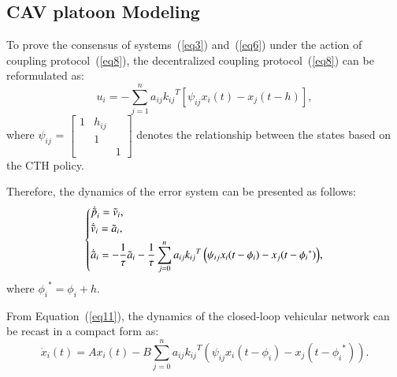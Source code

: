 \documentclass[journal]{IEEEtran}
\begin{document}
\subsection{CAV platoon Modeling}
\label{Section 3.2}

To prove the consensus of systems~(\ref{eq3}) and~(\ref{eq6}) under the action of coupling protocol~(\ref{eq8}), the decentralized coupling protocol~(\ref{eq8}) can be reformulated as:
\begin{equation}
  {u_i} =  - \sum\limits_{j = 1}^n {{a_{ij}}{k_{ij}}^T\left[ {{\psi _{ij}}{x_i}(t) - {x_j}(t - h)} \right]} ,
  \label{eq10}
\end{equation}
where ${\psi _{ij}}{\text{ = }}\left[ {\begin{array}{*{20}{c}}
          1  & {{h_{ij}}} & {} \\
          {} & 1          & {} \\
          {} & {}         & 1
        \end{array}} \right]$ denotes the relationship between the states based on the CTH policy.

Therefore, the dynamics of the error system can be presented as follows:
\begin{equation}
  \left\{ \begin{gathered}
    {{\dot {\tilde p}}_i} = {{\tilde v}_i}, \hfill \\
    {{\dot {\tilde v}}_i} = {{\tilde a}_i}, \hfill \\
    {{\dot {\tilde a}}_i} =  - \frac{1}{\tau }{{\tilde a}_i} - \frac{1}{\tau }\sum\limits_{j = 0}^n {{a_{ij}}{k_{ij}}^T\left( {{\psi _{ij}}{x_i}(t - {\phi _i}) - {x_j}(t - {\phi _i}^*)} \right)},  \hfill \\
  \end{gathered}  \right.
  \label{eq11}
\end{equation}
where ${\phi_i}^\ast=\phi_i+h$.

From Equation~(\ref{eq11}), the dynamics of the closed-loop vehicular network can be recast in a compact form as:
\begin{equation}
  {\dot x_i}\left( t \right) = A{x_i}\left( t \right) - B\sum\limits_{j = 0}^n {{a_{ij}}{k_{ij}}^T\left( {{\psi _{ij}}{x_i}(t - {\phi _i}) - {x_j}(t - {\phi _i}^*)} \right)}.
  \label{eq12}
\end{equation}
\end{document}
